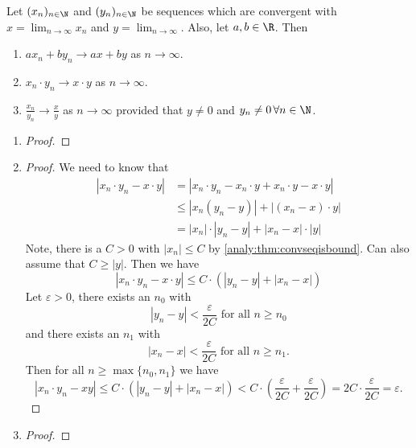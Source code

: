 \documentclass[10pt, a4paper]{article}
\newcommand{\seq}[1][x]{(#1_n)_{n \in \N}}
\begin{document}
\begin{theorem}\label{analy:thm:COLT}
    Let $\seq$ and $\seq[y]$ be sequences which are convergent with $x = \lim_{n \to \infty}x_n$ and $y = \lim_{n \to \infty}$.
    Also, let $a, b \in \R$.
    Then
    \begin{enumerate}[label = (\alph*)]
        \item $ax_n + by_n \to ax + by$ as $n \to \infty$.
        \item $x_n \cdot y_n \to x \cdot y$ as $n \to \infty$.
        \item $\frac{x_n}{y_n} \to \frac{x}{y}$ as $n \to \infty$ provided that $y \neq 0$ and $y_n \neq 0\,\forall n \in \N$.
    \end{enumerate}
    \begin{enumerate}[label = (\alph*)]
        \item
        \begin{proof}
        \end{proof}
        \item 
        \begin{proof}
        We need to know that
        \begin{align*}
        |x_n \cdot y_n - x \cdot y| &= |x_n \cdot y_n - x_n \cdot y + x_n \cdot y - x \cdot y| \\
        &\leq |x_n (y_n - y)| + |(x_n - x)\cdot y| \\
        &= |x_n| \cdot |y_n - y| + |x_n - x| \cdot |y|
        \end{align*}
        Note,
        there is a $C > 0$ with $|x_n| \leq C$ by \autoref{analy:thm:convseqisbound}.
        Can also assume that $C \geq |y|$.
        Then we have
        \[
        |x_n \cdot y_n - x \cdot y| \leq C \cdot (|y_n - y| + |x_n - x|)
        \]
        Let $\varepsilon > 0$,
        there exists an $n_0$ with
        \[
        |y_n - y| < \frac{\varepsilon}{2C}\text{ for all } n \geq n_0
        \]
        and there exists an $n_1$ with
        \[
        |x_n - x| < \frac{\varepsilon}{2C}\text{ for all } n \geq n_1.
        \]
        Then for all $n \geq \max\{n_0, n_1\}$ we have
        \[
        |x_n \cdot y_n - xy| \leq C \cdot (|y_n - y| + |x_n - x|) < C \cdot (\frac{\varepsilon}{2C} + \frac{\varepsilon}{2C}) = 2C \cdot \frac{\varepsilon}{2C} = \varepsilon.
        \]
        \end{proof}
        \item
        \begin{proof}
        \end{proof}
    \end{enumerate}
\end{theorem}
\end{document}
